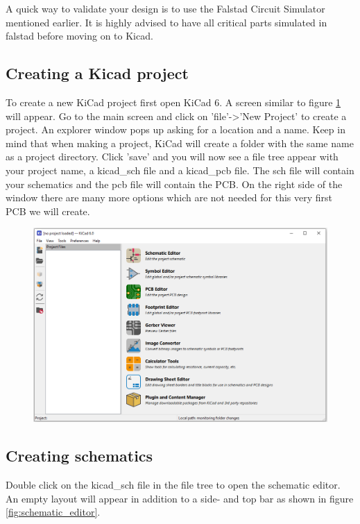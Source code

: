 \documentclass[12pt]{article}
\begin{document}
A quick way to validate your design is to use the Falstad Circuit Simulator mentioned earlier. It is highly advised to have all critical parts simulated in falstad before moving on to Kicad.

\subsection{Creating a Kicad project}
To create a new KiCad project first open KiCad 6. A screen similar to figure \ref{fig:kicad_main} will appear. Go to the main screen and click on 'file'->'New Project' to create a project. An explorer window pops up asking for a location and a name. Keep in mind that when making a project, KiCad will create a folder with the same name as a project directory. Click 'save' and you will now see a file tree appear with your project name, a kicad\_sch file and a kicad\_pcb file. The sch file will contain your schematics and the pcb file will contain the PCB. On the right side of the window there are many more options which are not needed for this very first PCB we will create. 

\begin{figure}[h]
	\centering
	\includegraphics[width=.9\textwidth]{../images/kicad_main.png }
	\caption{}
	\label{fig:kicad_main}
\end{figure}



\subsection{Creating schematics}
Double click on the kicad\_sch file in the file tree to open the schematic editor. An empty layout will appear in addition to a side- and top bar as shown in figure \ref{fig:schematic_editor}. 
\end{document}
